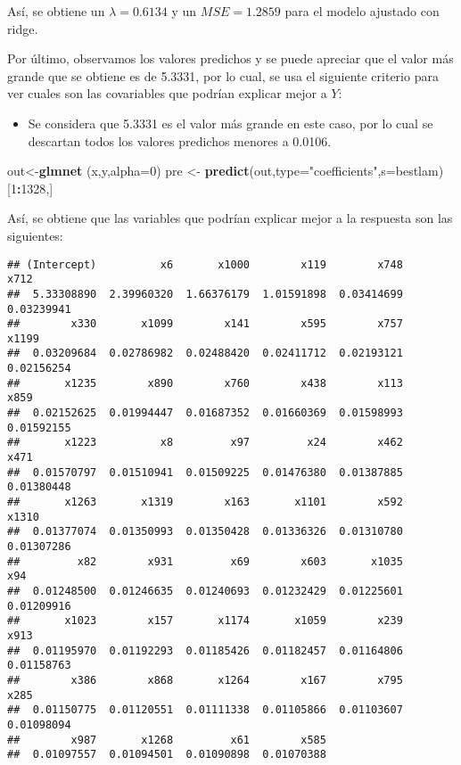 \documentclass[
]{article}
\newenvironment{Shaded}{\begin{snugshade}}{\end{snugshade}}
\newcommand{\DataTypeTok}[1]{\textcolor[rgb]{0.13,0.29,0.53}{#1}}
\newcommand{\DecValTok}[1]{\textcolor[rgb]{0.00,0.00,0.81}{#1}}
\newcommand{\KeywordTok}[1]{\textcolor[rgb]{0.13,0.29,0.53}{\textbf{#1}}}
\newcommand{\NormalTok}[1]{#1}
\newcommand{\OperatorTok}[1]{\textcolor[rgb]{0.81,0.36,0.00}{\textbf{#1}}}
\newcommand{\StringTok}[1]{\textcolor[rgb]{0.31,0.60,0.02}{#1}}
\providecommand{\tightlist}{%
  \setlength{\itemsep}{0pt}\setlength{\parskip}{0pt}}
\begin{document}
Así, se obtiene un \(\lambda = 0.6134\) y un \(MSE = 1.2859\) para el
modelo ajustado con ridge.

Por último, observamos los valores predichos y se puede apreciar que el
valor más grande que se obtiene es de 5.3331, por lo cual, se usa el
siguiente criterio para ver cuales son las covariables que podrían
explicar mejor a \(Y\):

\begin{itemize}
\tightlist
\item
  Se considera que 5.3331 es el valor más grande en este caso, por lo
  cual se descartan todos los valores predichos menores a 0.0106.
\end{itemize}

\begin{Shaded}
\begin{Highlighting}[]
\NormalTok{out<-}\KeywordTok{glmnet}\NormalTok{ (x,y,}\DataTypeTok{alpha=}\DecValTok{0}\NormalTok{)}
\NormalTok{pre <-}\StringTok{ }\KeywordTok{predict}\NormalTok{(out,}\DataTypeTok{type=}\StringTok{"coefficients"}\NormalTok{,}\DataTypeTok{s=}\NormalTok{bestlam)[}\DecValTok{1}\OperatorTok{:}\DecValTok{1328}\NormalTok{,]}
\end{Highlighting}
\end{Shaded}

Así, se obtiene que las variables que podrían explicar mejor a la
respuesta son las siguientes:

\begin{verbatim}
## (Intercept)          x6       x1000        x119        x748        x712 
##  5.33308890  2.39960320  1.66376179  1.01591898  0.03414699  0.03239941 
##        x330       x1099        x141        x595        x757       x1199 
##  0.03209684  0.02786982  0.02488420  0.02411712  0.02193121  0.02156254 
##       x1235        x890        x760        x438        x113        x859 
##  0.02152625  0.01994447  0.01687352  0.01660369  0.01598993  0.01592155 
##       x1223          x8         x97         x24        x462        x471 
##  0.01570797  0.01510941  0.01509225  0.01476380  0.01387885  0.01380448 
##       x1263       x1319        x163       x1101        x592       x1310 
##  0.01377074  0.01350993  0.01350428  0.01336326  0.01310780  0.01307286 
##         x82        x931         x69        x603       x1035         x94 
##  0.01248500  0.01246635  0.01240693  0.01232429  0.01225601  0.01209916 
##       x1023        x157       x1174       x1059        x239        x913 
##  0.01195970  0.01192293  0.01185426  0.01182457  0.01164806  0.01158763 
##        x386        x868       x1264        x167        x795        x285 
##  0.01150775  0.01120551  0.01111338  0.01105866  0.01103607  0.01098094 
##        x987       x1268         x61        x585 
##  0.01097557  0.01094501  0.01090898  0.01070388
\end{verbatim}
\end{document}
